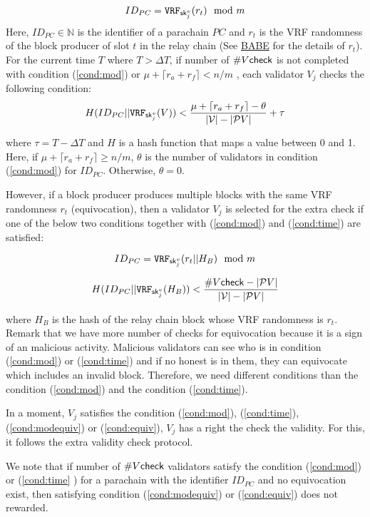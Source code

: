 \begin{enumerate}
    \begin{equation}\label{cond:mod}
        ID_{PC} = \mathtt{VRF}_{\mathsf{sk}^v_{j}}(r_{t}) \mod m    
    \end{equation}
     Here, $ID_{PC} \in \mathbb{N}$ is the identifier of a parachain $PC$ and $r_{t}$ is the VRF randomness of the block producer of slot $t$ in the relay chain (See \href{http://research.web3.foundation/en/latest/polkadot/BABE/Babe/}{BABE} for the details of $r_t$). For the current time $T$ where $T > \Delta T$, if  number of $\#V\mathsf{check}$ is not completed with condition (\ref{cond:mod}) or $\mu + \lceil r_a + r_f \rceil < n/m$ , each validator $V_j$ checks the following condition:
     \begin{equation}\label{cond:time}
        H(ID_{PC} || \mathtt{VRF}_{\mathsf{sk}^v_j}(V)) < \frac{\mu + \lceil r_a + r_f \rceil - \theta}{|\mathcal{V}|-|\mathcal{P}V|}+\tau  
    \end{equation}
    
      where $\tau = T- \Delta T$ and $H$ is a hash function that maps a value between 0 and 1. Here, if $\mu + \lceil r_a + r_f \rceil \geq n/m$, $\theta$ is the number of validators in condition (\ref{cond:mod}) for $ID_{PC}$. Otherwise, $\theta = 0$.
    
    However, if a block producer produces multiple blocks with the same VRF randomness $r_t$ (equivocation), then a validator $V_j$ is selected for the extra check if one of the  below two conditions together with (\ref{cond:mod}) and (\ref{cond:time}) are satisfied:
    
    
    \begin{equation}\label{cond:modequiv}
         ID_{PC} = \mathtt{VRF}_{\mathsf{sk}^v_{j}}(r_{t}||H_B) \mod m
    \end{equation}
    
    \begin{equation}\label{cond:equiv}
         H(ID_{PC} || \mathtt{VRF}_{\mathsf{sk}^v_j}(H_{B})) < \frac{\#V\mathsf{check} - |\mathcal{P}V|}{|\mathcal{V}|-|\mathcal{P}V|}   
    \end{equation}
    
     where $H_B$ is the hash of the relay chain block whose VRF randomness is $r_t$. Remark that we have more number of checks for equivocation because it is a sign of an malicious activity. Malicious validators can see who is in condition (\ref{cond:mod}) or (\ref{cond:time}) and if no honest is in them, they can equivocate which includes an invalid block. Therefore, we need different conditions than the condition (\ref{cond:mod}) and the condition (\ref{cond:time}).
    
    In a moment, $V_j$ satisfies the condition (\ref{cond:mod}), (\ref{cond:time}), (\ref{cond:modequiv}) or (\ref{cond:equiv}), $V_j$ has a right the check the validity. For this, it follows the extra validity check protocol.
    
    We note that if number of $\#V\mathsf{check}$ validators satisfy the condition (\ref{cond:mod}) or (\ref{cond:time} ) for a parachain with the identifier $ID_{PC}$ and no equivocation exist, then satisfying condition (\ref{cond:modequiv}) or (\ref{cond:equiv}) does not rewarded.
    
\end{enumerate}


